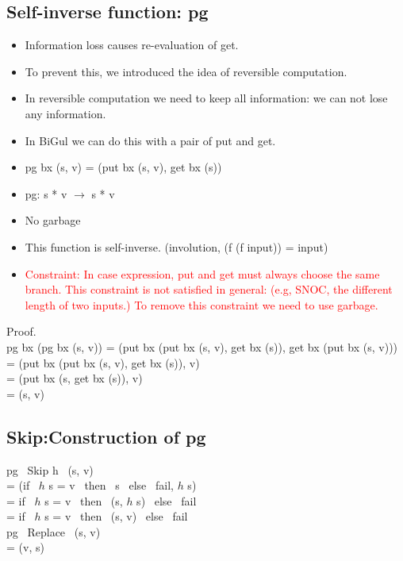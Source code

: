 \documentclass[runningheads]{llncs}
\newcommand{\sif}[3]{if \ {#1} \ then \ {#2} \ else \ {#3}}
\newcommand{\pg}[3]{pg \ #1 \ (#2, #3)}
\begin{document}
\subsection{Self-inverse function: pg}

\begin{itemize}
\item Information loss causes re-evaluation of get.
\item To prevent this, we introduced the idea of reversible computation.
\item In reversible computation we need to keep all information: we can not lose any information.
\item In BiGul we can do this with a pair of put and get.
\item pg bx (s, v) = (put bx (s, v), get bx (s))
\item pg: s * v $\to$ s * v
\item No garbage
\item This function is self-inverse. (involution, (f (f input)) = input)
\item \textcolor{red}{Constraint: In case expression, put and get must always choose the same branch. This constraint is not satisfied in general: (e.g, SNOC, the different length of two inputs.) To remove this constraint we need to use garbage.}
\end{itemize}

Proof.\\
pg bx (pg bx (s, v)) = (put bx (put bx (s, v), get bx (s)), get bx (put bx (s, v)))\\
= (put bx (put bx (s, v), get bx (s)), v)\\
= (put bx (s, get bx (s)), v)\\
= (s, v)\\

\subsection{Skip:Construction of pg}

\pg{Skip h}{s}{v} \\
= (\sif{$h$ s = v}{s}{fail}, {$h$ s})\\
= \sif{$h$ s = v}{(s, $h$ s)}{fail}\\
= \sif{$h$ s = v}{(s, v)}{fail}\\

\noindent
\pg{Replace}{s}{v}\\
= (v, s)\\
\end{document}
